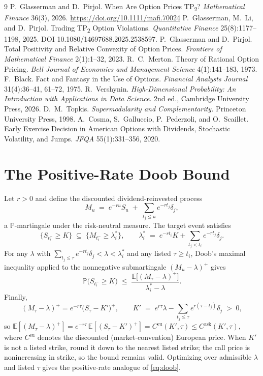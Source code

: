\documentclass[11pt]{article}
\theoremstyle{remark}
\newcommand{\E}{\mathbb{E}}
\newcommand{\Prob}{\mathbb{P}}
\begin{document}
\begin{thebibliography}{9}
 P.~Glasserman and D.~Pirjol. When Are Option Prices TP\textsubscript{2}? \emph{Mathematical Finance} 36(3), 2026. \url{https://doi.org/10.1111/mafi.70024}
 P.~Glasserman, M.~Li, and D.~Pirjol. Trading TP\textsubscript{2} Option Violations. \textit{Quantitative Finance} 25(8):1177--1198, 2025. DOI 10.1080/14697688.2025.2538597.
 P.~Glasserman and D.~Pirjol. Total Positivity and Relative Convexity of Option Prices. \emph{Frontiers of Mathematical Finance} 2(1):1--32, 2023.
 R.~C.~Merton. Theory of Rational Option Pricing. \emph{Bell Journal of Economics and Management Science} 4(1):141--183, 1973.
 F.~Black. Fact and Fantasy in the Use of Options. \emph{Financial Analysts Journal} 31(4):36--41, 61--72, 1975.
 R.~Vershynin. \emph{High-Dimensional Probability: An Introduction with Applications in Data Science}. 2nd ed., Cambridge University Press, 2026.
 D.~M.~Topkis. \emph{Supermodularity and Complementarity.} Princeton University Press, 1998.
 A.~Cosma, S.~Galluccio, P.~Pederzoli, and O.~Scaillet. Early Exercise Decision in American Options with Dividends, Stochastic Volatility, and Jumps. \emph{JFQA} 55(1):331--356, 2020.
\end{thebibliography}


\appendix
\section{The Positive-Rate Doob Bound}\label{app:doobr}
Let $r>0$ and define the discounted dividend-reinvested process
\[
M_u\;=\;e^{-ru}S_u\;+\;\sum_{t_j\le u}e^{-rt_j}\delta_j,
\]
a $\Prob$-martingale under the risk-neutral measure. The target event satisfies
\[
\{S_{t_i^-}\ge K\}\;\subseteq\;\Big\{M_{t_i^-}\ge \lambda_i^*\Big\},
\qquad
\lambda_i^*\;=\;e^{-rt_i}K+\sum_{t_j<t_i}e^{-rt_j}\delta_j .
\]
For any $\lambda$ with $\sum_{t_j\le\tau}e^{-rt_j}\delta_j<\lambda<\lambda_i^*$ and any listed $\tau\ge t_i$, Doob's maximal inequality applied to the nonnegative submartingale $(M_u-\lambda)^+$ gives
\[
\Prob\big(S_{t_i^-}\ge K\big)\;\le\;\frac{\E\big[(M_\tau-\lambda)^+\big]}{\lambda_i^*-\lambda}.
\]
Finally,
\[
(M_\tau-\lambda)^+=e^{-r\tau}\Big(S_\tau-K'\Big)^+,
\qquad
K'\;=\;e^{r\tau}\lambda-\sum_{t_j\le\tau}e^{r(\tau-t_j)}\delta_j\;>\;0,
\]
so $\E[(M_\tau-\lambda)^+]=e^{-r\tau}\,\E[(S_\tau-K')^+]=C^{\mathrm{eu}}(K',\tau)\le C^{\mathrm{ask}}(K',\tau)$, where $C^{\mathrm{eu}}$ denotes the discounted (market-convention) European price. When $K'$ is not a listed strike, round it down to the nearest listed strike; the call price is nonincreasing in strike, so the bound remains valid. Optimizing over admissible $\lambda$ and listed $\tau$ gives the positive-rate analogue of \eqref{eq:doob}.
\end{document}
